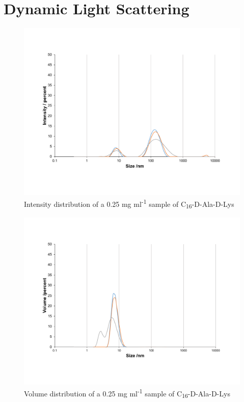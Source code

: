 
\chapter{Dynamic Light Scattering} %

\label{AppendixD} %
\begin{figure} [ht!]
\centering
\includegraphics[scale=0.47]{DLS/KAT1_35_0_25mg_ml-1_size.pdf}
\caption{Intensity distribution of a 0.25 mg ml\textsuperscript{-1} sample of C\textsubscript{16}-D-Ala-D-Lys}
\label{intensity_0.25_KAT1.35}
\end{figure}

\begin{figure} [ht!]
\centering
\includegraphics[scale=0.47]{DLS/KAT1_35_0_25mg_ml-1_volume.pdf}
\caption{Volume distribution of a 0.25 mg ml\textsuperscript{-1} sample of C\textsubscript{16}-D-Ala-D-Lys}
\label{volume_0.25_KAT1.35}
\end{figure}

